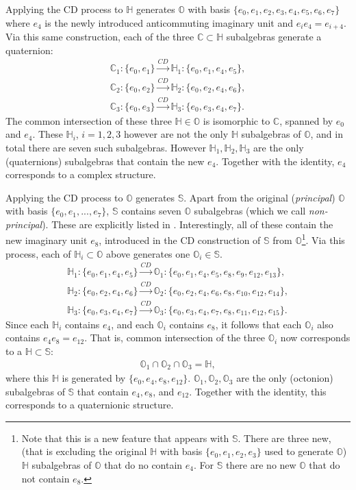 \documentclass{article}
\newcommand{\bb}[1]{\mathbb{#1}}
\begin{document}
Applying the CD process to $\bb{H}$ generates $\bb{O}$ with basis $\{e_0,e_1,e_2,e_3,e_4,e_5,e_6,e_7\}$ where $e_4$ is the newly introduced anticommuting imaginary unit and $e_ie_4=e_{i+4}$. Via this same construction, each of the three $\bb{C}\subset\bb{H}$ subalgebras generate a quaternion:
\begin{eqnarray}
\bb{C}_1: \{e_0,e_1\}\xrightarrow{CD} \bb{H}_1: \{e_0,e_1,e_4,e_5\},\\
\bb{C}_2: \{e_0,e_2\}\xrightarrow{CD} \bb{H}_2: \{e_0,e_2,e_4,e_6\},\\
\bb{C}_3: \{e_0,e_3\}\xrightarrow{CD} \bb{H}_3: \{e_0,e_3,e_4,e_7\}.
\end{eqnarray}
The common intersection of these three $\bb{H}\in\bb{O}$ is isomorphic to $\bb{C}$, spanned by $e_0$ and $e_4$. These $\bb{H}_i$, $i=1,2,3$ however are not the only $\bb{H}$ subalgebras of $\bb{O}$, and in total there are seven such subalgebras. However $\bb{H}_1, \bb{H}_2, \bb{H}_3$ are the only (quaternions) subalgebras that contain the new $e_4$. Together with the identity, $e_4$ corresponds to a complex structure. 



Applying the CD process to $\bb{O}$ generates $\bb{S}$. Apart from the original (\textit{principal}) $\bb{O}$ with basis $\{e_0,e_1,...,e_7\}$, $\bb{S}$ contains seven $\bb{O}$ subalgebras (which we call \textit{non-principal}). These are explicitly listed in \cite{cawagas2004structure}. Interestingly, all of these contain the new imaginary unit $e_8$, introduced in the CD construction of $\bb{S}$ from $\bb{O}$\footnote{Note that this is a new feature that appears with $\bb{S}$. There are three new, (that is excluding the original $\bb{H}$ with basis $\{e_0,e_1,e_2,e_3\}$ used to generate $\bb{O}$) $\bb{H}$ subalgebras of $\bb{O}$ that do no contain $e_4$. For $\bb{S}$ there are no new $\bb{O}$ that do not contain $e_8$.}. Via this process, each of $\bb{H}_i\subset\bb{O}$ above generates one $\bb{O}_i\in\bb{S}$.  
\begin{eqnarray}
\bb{H}_1: \{e_0,e_1,e_4,e_5\}\xrightarrow{CD} \bb{O}_1: \{e_0,e_1,e_4,e_5,e_8,e_9,e_{12},e_{13}\},\\
\bb{H}_2: \{e_0,e_2,e_4,e_6\}\xrightarrow{CD} \bb{O}_2: \{e_0,e_2,e_4,e_6,e_8,e_{10},e_{12},e_{14}\},\\
\bb{H}_3: \{e_0,e_3,e_4,e_7\}\xrightarrow{CD} \bb{O}_3: \{e_0,e_3,e_4,e_7,e_8,e_{11},e_{12},e_{15}\}.
\end{eqnarray}
Since each $\bb{H}_i$ contains $e_4$, and each $\bb{O}_i$ contains $e_8$, it follows that each $\bb{O}_i$ also contains $e_4e_8=e_{12}$. That is, common intersection of the three $\bb{O}_i$ now corresponds to a $\bb{H}\subset\bb{S}$:
\begin{eqnarray}\label{commonintersection}
\bb{O}_1\cap \bb{O}_2\cap\bb{O}_3=\bb{H},
\end{eqnarray}
where this $\bb{H}$ is generated by $\{e_0,e_4,e_8,e_{12}\}$. $\bb{O}_1, \bb{O}_2, \bb{O}_3$ are the only (octonion) subalgebras of $\bb{S}$ that contain $e_4,e_8$, and $e_{12}$. Together with the identity, this corresponds to a quaternionic structure. 
\end{document}
